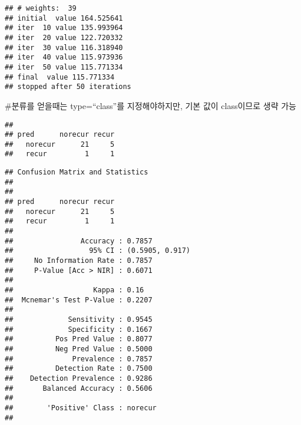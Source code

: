 \documentclass[]{article}
\newenvironment{Shaded}{\begin{snugshade}}{\end{snugshade}}
\newcommand{\DataTypeTok}[1]{\textcolor[rgb]{0.13,0.29,0.53}{#1}}
\newcommand{\KeywordTok}[1]{\textcolor[rgb]{0.13,0.29,0.53}{\textbf{#1}}}
\newcommand{\NormalTok}[1]{#1}
\newcommand{\OperatorTok}[1]{\textcolor[rgb]{0.81,0.36,0.00}{\textbf{#1}}}
\newcommand{\StringTok}[1]{\textcolor[rgb]{0.31,0.60,0.02}{#1}}
\begin{document}
\begin{verbatim}
## # weights:  39
## initial  value 164.525641 
## iter  10 value 135.993964
## iter  20 value 122.720332
## iter  30 value 116.318940
## iter  40 value 115.973936
## iter  50 value 115.771334
## final  value 115.771334 
## stopped after 50 iterations
\end{verbatim}

\#분류를 얻을때는 type=``class''를 지정해야하지만, 기본 값이 class이므로
생략 가능

\begin{Shaded}
\end{Shaded}

\begin{verbatim}
##          
## pred      norecur recur
##   norecur      21     5
##   recur         1     1
\end{verbatim}

\begin{Shaded}
\end{Shaded}

\begin{verbatim}
## Confusion Matrix and Statistics
## 
##          
## pred      norecur recur
##   norecur      21     5
##   recur         1     1
##                                          
##                Accuracy : 0.7857         
##                  95% CI : (0.5905, 0.917)
##     No Information Rate : 0.7857         
##     P-Value [Acc > NIR] : 0.6071         
##                                          
##                   Kappa : 0.16           
##  Mcnemar's Test P-Value : 0.2207         
##                                          
##             Sensitivity : 0.9545         
##             Specificity : 0.1667         
##          Pos Pred Value : 0.8077         
##          Neg Pred Value : 0.5000         
##              Prevalence : 0.7857         
##          Detection Rate : 0.7500         
##    Detection Prevalence : 0.9286         
##       Balanced Accuracy : 0.5606         
##                                          
##        'Positive' Class : norecur        
## 
\end{verbatim}
\end{document}
